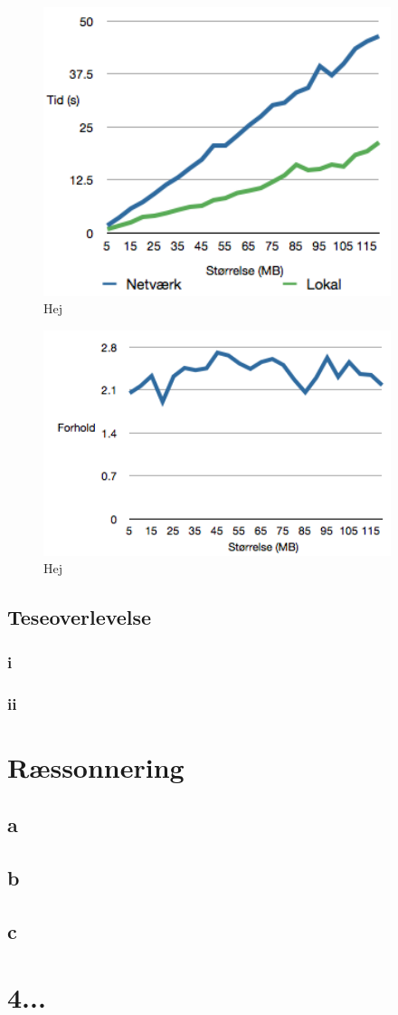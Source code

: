 \documentclass{article}
\begin{document}
\begin{figure}
	\includegraphics[width=4in]{ploto.png}
	\caption{Hej}
	\label{ploto}
\end{figure}

\begin{figure}
	\includegraphics[width=4in]{plotforhold.png}
	\caption{Hej}
	\label{plotforhold}
\end{figure}

\subsection{Teseoverlevelse}

\subsubsection{i}

\subsubsection{ii}

\section{Ræssonnering}

\subsection{a}
\subsection{b}
\subsection{c}

\section{4...}
\end{document}
